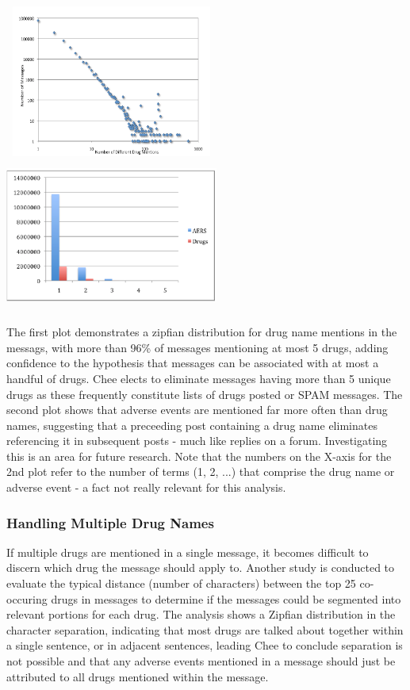 \documentclass[twoside,11pt]{article}
\begin{document}
\includegraphics[width=7cm, height=5cm]{Figure-1-Zipfian.png}
\includegraphics[width=7cm, height=5cm]{Figure-2-AERS_Drugs.png}


The first plot demonstrates a zipfian distribution for drug name mentions in the messags, with more than 96\% of messages mentioning at most 5 drugs, adding confidence to the hypothesis that messages can be associated with at most a handful of drugs. Chee elects to eliminate messages having more than 5 unique drugs as these frequently constitute lists of drugs posted or SPAM messages. The second plot shows that adverse events are mentioned far more often than drug names, suggesting that a preceeding post containing a drug name eliminates referencing it in subsequent posts - much like replies on a forum. Investigating this is an area for future research. Note that the numbers on the X-axis for the 2nd plot refer to the number of terms (1, 2, ...) that comprise the drug name or adverse event - a fact not really relevant for this analysis.

\subsubsection{Handling Multiple Drug Names}
If multiple drugs are mentioned in a single message, it becomes difficult to discern which drug the message should apply to. Another study is conducted to evaluate the typical distance (number of characters) between the top 25 co-occuring drugs in messages to determine if the messages could be segmented into relevant portions for each drug. The analysis shows a Zipfian distribution in the character separation, indicating that most drugs are talked about together within a single sentence, or in adjacent sentences, leading Chee to conclude separation is not possible and that any adverse events mentioned in a message should just be attributed to all drugs mentioned within the message.
\end{document}
